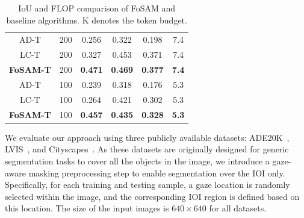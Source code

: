 \documentclass{article}
\begin{document}
\begin{table}
{\begin{tabular}{c|c|c|c|c|c}
        AD-T & 200  & 0.256  & 0.322  & 0.198 & 7.4\\
        LC-T & 200  & 0.327  & 0.453  & 0.371 & 7.4\\
        \rowcolor{blue!10}
        \textbf{FoSAM-T} & 200  & \textbf{0.471}  & \textbf{0.469}  & \textbf{0.377} & \textbf{7.4}\\ \midrule
          
        AD-T & 100 & 0.239  & 0.318  & 0.176 & 5.3\\           
        LC-T & 100  & 0.264  & 0.421  & 0.302 & 5.3\\ 
        \rowcolor{blue!10}
        \textbf{FoSAM-T} & 100 & \textbf{0.457}  & \textbf{0.435}  & \textbf{0.328} & \textbf{5.3}\\ 
        \bottomrule
        \end{tabular}
}
\caption{IoU and FLOP comparison of FoSAM and baseline algorithms. K denotes the token budget.}
\label{tab:eval:main}
\vspace{-5pt}
\end{table}

We evaluate our approach using three publicly available datasets: ADE20K~\cite{zhou2019ade20k}, LVIS~\cite{gupta2019lvisdatasetlargevocabulary}, and Cityscapes~\cite{Cordts2016Cityscapes}. As these datasets are originally designed for generic segmentation tasks to cover all the objects in the image, we introduce a gaze-aware masking preprocessing step to enable segmentation over the IOI only. Specifically, for each training and testing sample, a gaze location is randomly selected within the image, and the corresponding IOI region is defined based on this location. The size of the input images is $640\times 640$ for all datasets. %
\end{document}
